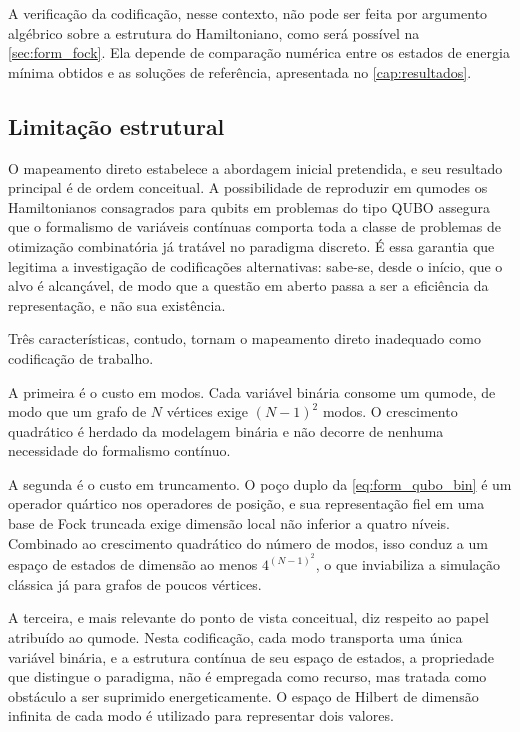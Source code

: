         A verificação da codificação, nesse contexto, não pode ser feita por argumento algébrico sobre a estrutura do Hamiltoniano, como será possível na \autoref{sec:form_fock}. Ela depende de comparação numérica entre os estados de energia mínima obtidos e as soluções de referência, apresentada no \autoref{cap:resultados}.

    \subsection{Limitação estrutural}\label{subsec:form_qubo_limitacao}

        O mapeamento direto estabelece a abordagem inicial pretendida, e seu resultado principal é de ordem conceitual. A possibilidade de reproduzir em qumodes os Hamiltonianos consagrados para qubits em problemas do tipo QUBO assegura que o formalismo de variáveis contínuas comporta toda a classe de problemas de otimização combinatória já tratável no paradigma discreto. É essa garantia que legitima a investigação de codificações alternativas: sabe-se, desde o início, que o alvo é alcançável, de modo que a questão em aberto passa a ser a eficiência da representação, e não sua existência.

        Três características, contudo, tornam o mapeamento direto inadequado como codificação de trabalho.

        A primeira é o custo em modos. Cada variável binária consome um qumode, de modo que um grafo de $N$ vértices exige $(N-1)^2$ modos. O crescimento quadrático é herdado da modelagem binária e não decorre de nenhuma necessidade do formalismo contínuo.

        A segunda é o custo em truncamento. O poço duplo da \autoref{eq:form_qubo_bin} é um operador quártico nos operadores de posição, e sua representação fiel em uma base de Fock truncada exige dimensão local não inferior a quatro níveis. Combinado ao crescimento quadrático do número de modos, isso conduz a um espaço de estados de dimensão ao menos $4^{(N-1)^2}$, o que inviabiliza a simulação clássica já para grafos de poucos vértices.

        A terceira, e mais relevante do ponto de vista conceitual, diz respeito ao papel atribuído ao qumode. Nesta codificação, cada modo transporta uma única variável binária, e a estrutura contínua de seu espaço de estados, a propriedade que distingue o paradigma, não é empregada como recurso, mas tratada como obstáculo a ser suprimido energeticamente. O espaço de Hilbert de dimensão infinita de cada modo é utilizado para representar dois valores.

